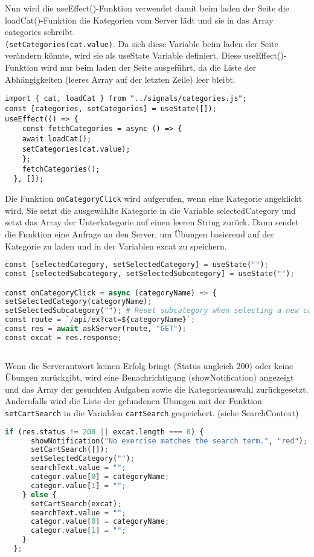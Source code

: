 Nun wird die useEffect()-Funktion verwendet damit beim laden der Seite die loadCat()-Funktion die Kategorien vom Server lädt und sie in das Array categories schreibt \\\texttt{(setCategories(cat.value)}. Da sich diese Variable beim laden der Seite verändern könnte, wird sie als useState Variable definiert. 
Diese useEffect()-Funktion wird nur beim laden der Seite ausgeführt, da die Liste der Abhängigkeiten (leeres Array auf der letzten Zeile) leer bleibt. 

\begin{lstlisting}
import { cat, loadCat } from "../signals/categories.js";
const [categories, setCategories] = useState([]);
useEffect(() => {
    const fetchCategories = async () => {
    await loadCat();
    setCategories(cat.value);
    };
    fetchCategories();
  }, []);

\end{lstlisting}


Die Funktion \texttt{onCategoryClick} wird aufgerufen, wenn eine Kategorie angeklickt wird. Sie setzt die ausgewählte Kategorie in die Variable selectedCategory und setzt das Array der Unterkategorie auf einen leeren String zurück. Dann sendet die Funktion eine Anfrage an den Server, um Übungen basierend auf der Kategorie zu laden und in der Variablen excat zu speichern.

\begin{lstlisting}[language=Python]
const [selectedCategory, setSelectedCategory] = useState("");
const [selectedSubcategory, setSelectedSubcategory] = useState("");

const onCategoryClick = async (categoryName) => {
setSelectedCategory(categoryName);
setSelectedSubcategory(""); # Reset subcategory when selecting a new category
const route = `/api/ex?cat=${categoryName}`;
const res = await askServer(route, "GET");
const excat = res.response;
    
\end{lstlisting}

 Wenn die Serverantwort keinen Erfolg bringt (Status ungleich 200) oder keine Übungen zurückgibt, wird eine Benachrichtigung (showNotification) angezeigt und das Array der gesuchten Aufgaben sowie die Kategorieauswahl zurückgesetzt. Andernfalls wird die Liste der gefundenen Übungen mit der Funktion \texttt{setCartSearch} in die Variablen \texttt{cartSearch} gespeichert. (siehe SearchContext)


\begin{lstlisting}[language=Python]
    if (res.status != 200 || excat.length === 0) {
      showNotification("No exercise matches the search term.", "red");
      setCartSearch([]);
      setSelectedCategory("");
      searchText.value = "";
      categor.value[0] = categoryName;
      categor.value[1] = "";
    } else {
      setCartSearch(excat);
      searchText.value = "";
      categor.value[0] = categoryName;
      categor.value[1] = "";
    }
  };


\end{lstlisting}



